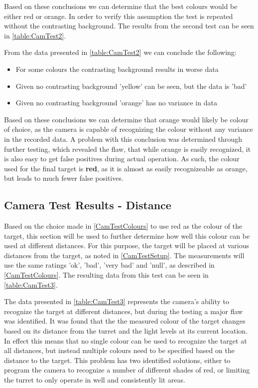 Based on these conclusions we can determine that the best colours would be
either red or orange. In order to verify this assumption the test is repeated
without the contrasting background. The results from the second test can be seen
in \autoref{table:CamTest2}.


From the data presented in \autoref{table:CamTest2} we can conclude the
following:
\begin{itemize}
  \item For some colours the contrasting background results in worse data
  \item Given no contrasting background 'yellow' can be seen, but the data is
  'bad'
  \item Given no contrasting background 'orange' has no variance in data
\end{itemize}

Based on these conclusions we can determine that orange would likely be colour
of choice, as the camera is capable of recognizing the colour without any
variance in the recorded data. A problem with this conclusion was determined
through further testing, which revealed the flaw, that while orange is easily
recognized, it is also easy to get false positives during actual operation. As
such, the colour used for the final target is \textbf{red}, as it is almost as
easily recognizeable as orange, but leads to much fewer false positives.

\subsection{Camera Test Results - Distance}\label{CamTestDistance}
Based on the choice made in \autoref{CamTestColours} to use red as the colour
of the target, this section will be used to further determine how well this
colour can be used at different distances. For this purpose, the target will be
placed at various distances from the target, as noted in \autoref{CamTestSetup}.
The measurements will use the same ratings 'ok', 'bad', 'very bad' and 'null',
as described in \autoref{CamTestColours}. The resulting data from this test can be
seen in \autoref{table:CamTest3}.


The data presented in \autoref{table:CamTest3} represents the camera's ability
to recognize the target at different distances, but during the testing a major
flaw was identified. It was found that the the measured colour of the target
changes based on its distance from the turret and the light levels at its
current location. In effect this means that no single colour can be used to
recognize the target at all distances, but instead multiple colours need to be
specified based on the distance to the target. This problem has two identified
solutions, either to program the camera to recognize a number of different
shades of red, or limiting the turret to only operate in well and consistently
lit areas.

